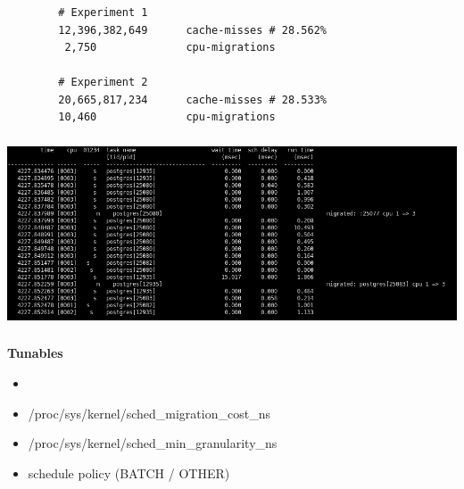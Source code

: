 \documentclass[usenames,dvipsnames, 18pt, compress, aspectratio=169]{beamer}
\begin{document}
\begin{frame}[fragile]{}
    \frametitle{}
    \begin{center}

        \begin{verbatim}
        # Experiment 1
        12,396,382,649      cache-misses # 28.562%
         2,750              cpu-migrations

        # Experiment 2
        20,665,817,234      cache-misses # 28.533%
        10,460              cpu-migrations
        \end{verbatim}

    \end{center}
\end{frame}

\begin{frame}
    \frametitle{}
    \begin{center}

        \includegraphics[width=1.0\textwidth,center]{migrations.png}

    \end{center}
\end{frame}

\begin{frame}
    \frametitle{}
    \begin{center}
    \textbf{Tunables}

        \begin{itemize}
            \item <+->
        \end{itemize}

        \begin{itemize}[label={\MVRightarrow}]
            \item <+-> /proc/sys/kernel/sched\_migration\_cost\_ns
            \item <+-> /proc/sys/kernel/sched\_min\_granularity\_ns
            \item <+-> schedule policy (BATCH / OTHER)
        \end{itemize}

    \end{center}
\end{frame}
\end{document}
